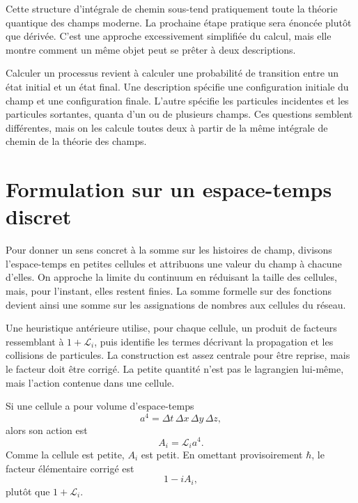 Cette structure d’intégrale de chemin sous-tend pratiquement toute la théorie quantique des champs moderne. La prochaine étape pratique sera énoncée plutôt que dérivée. C’est une approche excessivement simplifiée du calcul, mais elle montre comment un même objet peut se prêter à deux descriptions.

Calculer un processus revient à calculer une probabilité de transition entre un état initial et un état final. Une description spécifie une configuration initiale du champ et une configuration finale. L’autre spécifie les particules incidentes et les particules sortantes, quanta d’un ou de plusieurs champs. Ces questions semblent différentes, mais on les calcule toutes deux à partir de la même intégrale de chemin de la théorie des champs.

\section{Formulation sur un espace-temps discret}

Pour donner un sens concret à la somme sur les histoires de champ, divisons l’espace-temps en petites cellules et attribuons une valeur du champ à chacune d’elles. On approche la limite du continuum en réduisant la taille des cellules, mais, pour l’instant, elles restent finies. La somme formelle sur des fonctions devient ainsi une somme sur les assignations de nombres aux cellules du réseau.

Une heuristique antérieure utilise, pour chaque cellule, un produit de facteurs ressemblant à \(1+\mathcal{L}_i\), puis identifie les termes décrivant la propagation et les collisions de particules. La construction est assez centrale pour être reprise, mais le facteur doit être corrigé. La petite quantité n’est pas le lagrangien lui-même, mais l’action contenue dans une cellule.

Si une cellule a pour volume d’espace-temps
\begin{equation}
a^4=\Delta t\,\Delta x\,\Delta y\,\Delta z,
\end{equation}
alors son action est
\begin{equation}
A_i=\mathcal{L}_i a^4.
\end{equation}
Comme la cellule est petite, \(A_i\) est petit. En omettant provisoirement \(\hbar\), le facteur élémentaire corrigé est
\begin{equation}
1-iA_i,
\end{equation}
plutôt que \(1+\mathcal{L}_i\).

